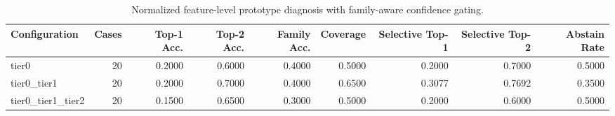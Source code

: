 \begin{table}[t]
\centering
\caption{Normalized feature-level prototype diagnosis with family-aware confidence gating.}
\label{tab:dice_stressor_hierarchical_diagnosis}
\footnotesize
\begin{tabular}{lrrrrrrrr}
\toprule
Configuration & Cases & Top-1 Acc. & Top-2 Acc. & Family Acc. & Coverage & Selective Top-1 & Selective Top-2 & Abstain Rate \\
\midrule
tier0 & 20 & 0.2000 & 0.6000 & 0.4000 & 0.5000 & 0.2000 & 0.7000 & 0.5000 \\
tier0_tier1 & 20 & 0.2000 & 0.7000 & 0.4000 & 0.6500 & 0.3077 & 0.7692 & 0.3500 \\
tier0_tier1_tier2 & 20 & 0.1500 & 0.6500 & 0.3000 & 0.5000 & 0.2000 & 0.6000 & 0.5000 \\
\bottomrule
\end{tabular}

\end{table}
